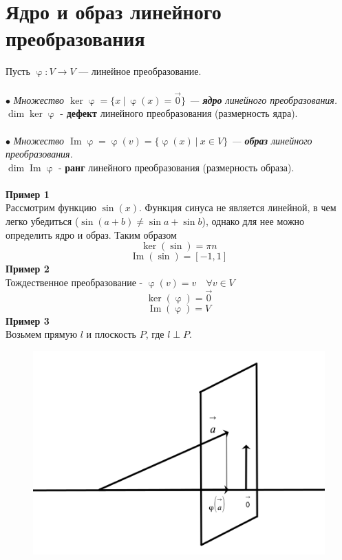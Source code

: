 \documentclass[a4paper, 12pt]{article}
\renewcommand{\Im}{\operatorname{Im}}
\renewcommand{\ker}{\operatorname{ker}}
\renewcommand{\varphi}{\upvarphi}
\begin{document}
\section{Ядро и образ линейного преобразования}
Пусть $\varphi:V\rightarrow V$ --- линейное преобразование.\\\\
$\bullet$ \textit{Множество $\ker \varphi = \{x\ |\ \varphi(x)=\vec 0\}$ --- \textbf{ядро} линейного преобразования.}\\
$\dim \ker \varphi$ - \textbf{дефект} линейного преобразования (размерность ядра).\\\\
$\bullet$ \textit{Множество $\Im \varphi = \varphi(v)=\{\varphi(x)\ |\ x \in V\}$ --- \textbf{образ} линейного преобразования.}\\
$\dim \Im \varphi$ - \textbf{ранг} линейного преобразования (размерность образа).\\\\
\textbf{Пример 1}\\
Рассмотрим функцию $\sin(x)$. Функция синуса не является линейной, в чем легко убедиться ($\sin(a+b) \neq \sin a + \sin b$), однако для нее можно определить ядро и образ. Таким образом
$$\ker (\sin) = {\pi n}$$
$$\Im (\sin) = [-1,1]$$
\textbf{Пример 2}\\
Тождественное преобразование - $\varphi(v)=v \quad \forall v \in V$
$$\ker( \varphi) = \vec 0$$
$$\Im (\varphi) = V$$
\textbf{Пример 3}\\
Возьмем прямую $l$ и плоскость $P$, где $l \perp P$.
\begin{figure}[h]
    \begin{center}
    \includegraphics[scale=0.8]{0st25sYXFU (1).png}
    \end{center}
    \end{figure}\\
\end{document}
